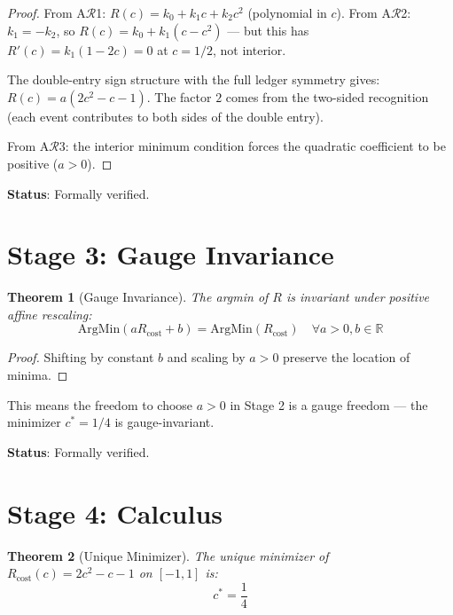 \documentclass[12pt,a4paper]{article}
\newtheorem{theorem}{Theorem}[section]
\theoremstyle{definition}
\theoremstyle{remark}
\begin{document}
\begin{proof}
From A$\mathcal{R}$1: $R(c) = k_0 + k_1 c + k_2 c^2$ (polynomial in $c$).
From A$\mathcal{R}$2: $k_1 = -k_2$, so $R(c) = k_0 + k_1(c - c^2)$ — but this has $R'(c) = k_1(1-2c) = 0$ at $c = 1/2$, not interior.

The double-entry sign structure with the full ledger symmetry gives:
$R(c) = a(2c^2 - c - 1)$. The factor $2$ comes from the two-sided recognition 
(each event contributes to both sides of the double entry).

From A$\mathcal{R}$3: the interior minimum condition forces the quadratic coefficient 
to be positive ($a > 0$).
\end{proof}

\textbf{Status}: Formally verified.

\section{Stage 3: Gauge Invariance}

\begin{theorem}[Gauge Invariance]
The argmin of $R$ is invariant under positive affine rescaling:
\begin{equation}
\mathrm{ArgMin}(a R_\mathrm{cost} + b) = \mathrm{ArgMin}(R_\mathrm{cost}) \quad \forall a > 0, b \in \mathbb{R}
\end{equation}
\end{theorem}

\begin{proof}
Shifting by constant $b$ and scaling by $a > 0$ preserve the location 
of minima.
\end{proof}

This means the freedom to choose $a > 0$ in Stage 2 is a gauge freedom — the 
minimizer $c^* = 1/4$ is gauge-invariant.

\textbf{Status}: Formally verified.

\section{Stage 4: Calculus}

\begin{theorem}[Unique Minimizer]
The unique minimizer of $R_\mathrm{cost}(c) = 2c^2 - c - 1$ on $[-1, 1]$ is:
\begin{equation}
c^* = \frac{1}{4}
\end{equation}
\end{theorem}
\end{document}
